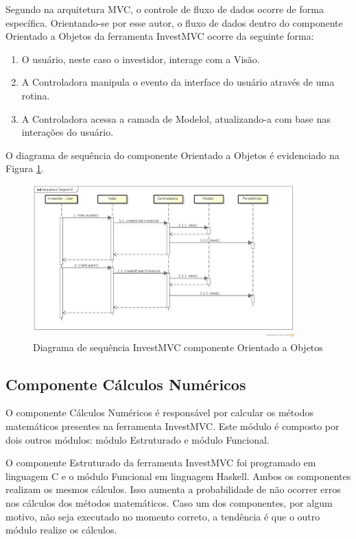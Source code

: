 Segundo  na arquitetura MVC, o controle de fluxo de dados ocorre de forma específica. Orientando-se por esse autor, o fluxo de dados dentro do componente Orientado a Objetos da ferramenta InvestMVC ocorre da seguinte forma:

\begin{enumerate}
\item O usuário, neste caso o investidor, interage com a Visão.
\item A Controladora manipula o evento da interface do usuário através de uma rotina.
\item A Controladora acessa a camada de Modelol, atualizando-a com base nas interações do usuário.
\end{enumerate}

O diagrama de sequência do componente Orientado a Objetos é evidenciado na Figura \ref{sequenciaOO}.

\begin{figure}[H]
\centering
\includegraphics[width=0.9\textwidth]{figuras/sequenciaOO}
\caption{Diagrama de sequência InvestMVC componente Orientado a Objetos}
\label{sequenciaOO}
\end{figure}

\subsection{Componente Cálculos Numéricos}

O componente Cálculos Numéricos é responsável por calcular os métodos matemáticos presentes na ferramenta InvestMVC. Este módulo é composto por dois outros módulos: módulo Estruturado e módulo Funcional.

O componente Estruturado da ferramenta InvestMVC foi programado em linguagem C e o módulo Funcional em linguagem Haskell. Ambos os componentes realizam os mesmos cálculos. Isso aumenta a probabilidade de não ocorrer erros nos cálculos dos métodos matemáticos. Caso um dos componentes, por algum motivo, não seja executado no momento correto, a tendência é que o outro módulo realize os cálculos.

